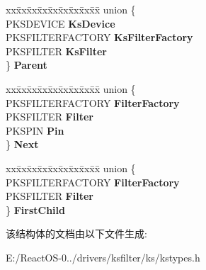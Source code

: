 \begin{DoxyCompactItemize}
\item 
\mbox{\label{struct_k_s_b_a_s_i_c___h_e_a_d_e_r_a0b96fdd95c94cc358863d0313d7aa6fc}} 
\begin{tabbing}
xx\=xx\=xx\=xx\=xx\=xx\=xx\=xx\=xx\=\kill
union \{\\
\>PKSDEVICE {\bfseries KsDevice}\\
\>PKSFILTERFACTORY {\bfseries KsFilterFactory}\\
\>PKSFILTER {\bfseries KsFilter}\\
\} {\bfseries Parent}\\

\end{tabbing}\item 
\mbox{\label{struct_k_s_b_a_s_i_c___h_e_a_d_e_r_af42c57e58c738335fbf8bb32c09364b0}} 
\begin{tabbing}
xx\=xx\=xx\=xx\=xx\=xx\=xx\=xx\=xx\=\kill
union \{\\
\>PKSFILTERFACTORY {\bfseries FilterFactory}\\
\>PKSFILTER {\bfseries Filter}\\
\>PKSPIN {\bfseries Pin}\\
\} {\bfseries Next}\\

\end{tabbing}\item 
\mbox{\label{struct_k_s_b_a_s_i_c___h_e_a_d_e_r_abe1218d25d1332b19c5f1368524ba69e}} 
\begin{tabbing}
xx\=xx\=xx\=xx\=xx\=xx\=xx\=xx\=xx\=\kill
union \{\\
\>PKSFILTERFACTORY {\bfseries FilterFactory}\\
\>PKSFILTER {\bfseries Filter}\\
\} {\bfseries FirstChild}\\

\end{tabbing}\end{DoxyCompactItemize}


该结构体的文档由以下文件生成\+:\begin{DoxyCompactItemize}
\item 
E\+:/\+React\+O\+S-\/0../drivers/ksfilter/ks/kstypes.\+h\end{DoxyCompactItemize}
